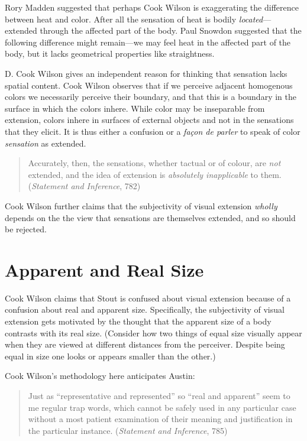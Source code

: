 \documentclass[11pt]{article}
\begin{document}
    \begin{discussion}
         Rory Madden suggested that perhaps Cook Wilson is exaggerating the difference between heat and color. After all the sensation of heat is bodily \emph{located}---extended through the affected part of the body. Paul Snowdon suggested that the following difference might remain---we may feel heat in the affected part of the body, but it lacks geometrical properties like straightness.
    \end{discussion}

D. Cook Wilson gives an independent reason for thinking that sensation lacks spatial content. Cook Wilson observes that if we perceive adjacent homogenous colors we necessarily perceive their boundary, and that this is a boundary in the surface in which the colors inhere. While color may be inseparable from extension, colors inhere in surfaces of external objects and not in the sensations that they elicit. It is thus either a confusion or a \emph{façon de parler} to speak of color \emph{sensation} as extended.
    \begin{quote}
        Accurately, then, the sensations, whether tactual or of colour, are \emph{not} extended, and the idea of extension is \emph{absolutely inapplicable} to them. (\emph{Statement and Inference}, 782)
    \end{quote}
Cook Wilson further claims that the subjectivity of visual extension \emph{wholly} depends on the the view that sensations are themselves extended, and so should be rejected.


\section{Apparent and Real Size}\label{sec:apparent_and_real_size} %

Cook Wilson claims that Stout is confused about visual extension because of a confusion about  real and apparent size. Specifically, the subjectivity of visual extension gets motivated by the thought that the apparent size of a body contrasts with its real size. (Consider how two things of equal size visually appear when they are viewed at different distances from the perceiver. Despite being equal in size one looks or appears smaller than the other.) 

Cook Wilson's methodology here anticipates Austin:
    \begin{quote}
    	Just as ``representative and represented'' so ``real and apparent'' seem to me regular trap words, which cannot be safely used in any particular case without a most patient examination of their meaning and justification in the particular instance. (\emph{Statement and Inference}, 785)
    \end{quote}
\end{document}
